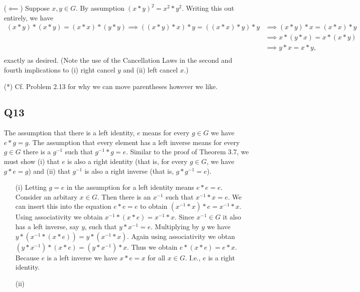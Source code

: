 \documentclass[12pt]{article}
\numberwithin{theorem}{section}
\numberwithin{equation}{section}
\numberwithin{remark}{section}
\numberwithin{definition}{section}
\numberwithin{theorem}{section}
\numberwithin{lemma}{section}
\numberwithin{example}{section}
\begin{document}
\vspace{\baselineskip}

\noindent ($\impliedby$) Suppose $x,y\in G$. By assumption $(x*y)^2=x^2*y^2$. Writing this out entirely, we have 
\begin{align*}
	(x*y)*(x*y)=(x*x)*(y*y) \implies ((x*y)*x)*y=((x*x)*y)*y & \implies (x*y)*x=(x*x)*y \\
	& \implies x*(y*x)=x*(x*y) \\
	& \implies y*x=x*y, \\	
\end{align*}
exactly as desired. (Note the use of the Cancellation Laws in the second and fourth implications to (i) right cancel $y$ and (ii) left cancel $x$.)

\vspace{\baselineskip}

\noindent (*) Cf. Problem 2.13 for why we can move parentheses however we like.



\subsection{Q13}

The assumption that there is a left identity, $e$ means for every $g\in G$ we have $e*g=g$. The assumption that every element has a left inverse means for every $g\in G$ there is a $g^{-1}$ such that $g^{-1}*g=e$. Similar to the proof of Theorem 3.7, we must show (i) that $e$ is also a right identity (that is, for every $g\in G$, we have $g*e=g$) and (ii) that $g^{-1}$ is also a right inverse (that is, $g*g^{-1}=e$). 

\begin{itemize}
	\item[(i)]{Letting $g=e$ in the assumption for a left identity means $e*e=e$. Consider an arbitary $x\in G$. Then there is an $x^{-1}$ such that $x^{-1}*x=e$. We can insert this into the equation $e*e=e$ to obtain $(x^{-1}*x)*e=x^{-1}*x$. Using associativity we obtain $x^{-1}*(x*e)=x^{-1}*x$. Since $x^{-1}\in G$ it also has a left inverse, say $y$, such that $y*x^{-1}=e$. Multiplying by $y$ we have $y*(x^{-1}*(x*e))=y*(x^{-1}*x)$. Again using associativity we obtan $(y*x^{-1})*(x*e)=(y*x^{-1})*x$. Thus we obtain $e*(x*e)=e*x$. Because $e$ is a left inverse we have $x*e=x$ for all $x\in G$. I.e., $e$ is a right identity.}
	\item[(ii)]{}
\end{itemize}
\end{document}
